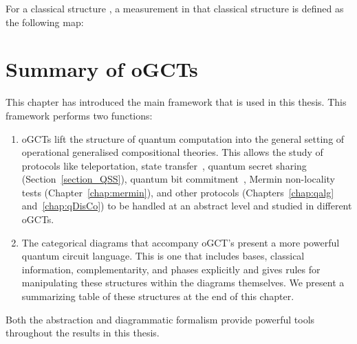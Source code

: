 \begin{defn}
\label{def:meas2}
  For a classical structure , a measurement in that classical structure is defined as
  the following map: 
  \begin{equation}
  
  \end{equation}
\end{defn}

\begin{example}
\end{example}

\section{Summary of oGCTs}

This chapter has introduced the main framework that is used in this thesis. This framework performs two functions:
\begin{enumerate}
\item oGCTs lift the structure of quantum computation into the general setting of operational generalised compositional theories. This allows the study of protocols like teleportation, state transfer~\cite{cqm-notes}, quantum secret sharing (Section~\ref{section_QSS}), quantum bit commitment~\cite{katriel-commitment}, Mermin non-locality tests (Chapter~\ref{chap:mermin}), and other protocols (Chapters~\ref{chap:qalg} and~\ref{chap:qDisCo}) to be handled at an abstract level and studied in different oGCTs.
\item The categorical diagrams that accompany oGCT's present a more powerful quantum circuit language. This is one that includes bases, classical information, complementarity, and phases explicitly and gives rules for manipulating these structures within the diagrams themselves. We present a summarizing table of these structures at the end of this chapter.
\end{enumerate}
Both the abstraction and diagrammatic formalism provide powerful tools throughout the results in this thesis.


